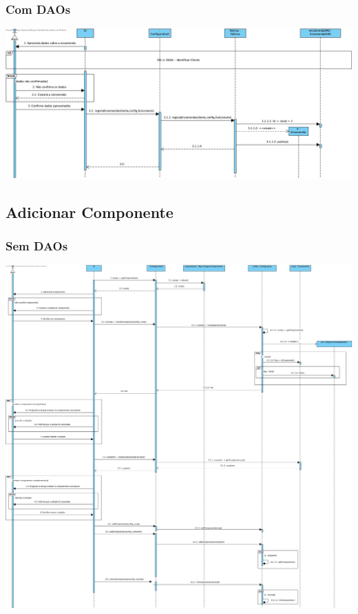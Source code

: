 \subsubsection{Com DAOs}
\begin{center}
 	\includegraphics[width = 5.5in]{DSI_D/DSI-DAOs-Registar_Encomenda.jpg}
\end{center}


\subsection{Adicionar Componente}
\subsubsection{Sem DAOs}
\begin{center}
 	\includegraphics[width = 5.5in]{DSI/DSI-Adicionar_Componente.jpg}
\end{center}
